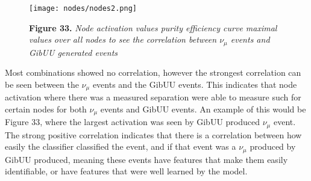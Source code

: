 \begin{figure}[h]
 \centering
 \texttt{[image: nodes/nodes2.png]}
 
 \textbf{Figure 33.} \textit{Node activation values purity efficiency curve maximal values over all nodes to see the correlation between $\nu_\mu$ events and GibUU generated events}

\end{figure}

\noindent Most combinations showed no correlation, however the strongest correlation can be seen between the $\nu_\mu$ events and the GibUU events. This indicates that node activation where there was a measured separation were able to measure such for certain nodes for both $\nu_\mu$ events and GibUU events. An example of this would be Figure 33, where the largest activation was seen by GibUU produced $\nu_\mu$ event. The strong positive correlation indicates that there is a correlation between how easily the classifier classified the event, and if that event was a $\nu_\mu$ produced by GibUU produced, meaning these events have features that make them easily identifiable, or have features that were well learned by the model.\medskip



